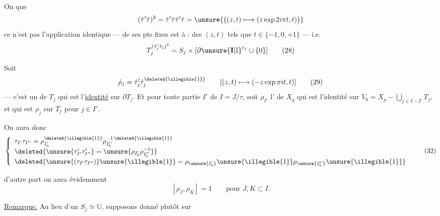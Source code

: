 
On  que
\[
(\dot\tau'\dot\tau)^2
=\dot\tau'\dot\tau\dot\tau'\dot\tau
=\unsure{\bigl((z,t)\longmapsto(z\exp 2i\pi t,t)\bigr)}
\]
ce n'est pas l'application identique ---  de ses pts fixes est  à : 
 des $(z,t)$ tels que $t\in\{-1,0,+1\}$ --- i.e.
\[
T_j^{(\dot\tau'_j\dot\tau_j)^2}
=S_j\times[\partial\unsure{\mathbf I|\mathbb I}^{\varepsilon_j}\cup\{0\}]
\tag{28}
\]



Soit 
\[
\dot\rho_j=\dot\tau'_j\dot\tau_j^{\deleted{\illegible{1}}}
\qquad [(z,t)\longmapsto(-z\exp\pi it,t)]
\tag{29}
\]
--- c'est un  de $T_j$ qui est l'\uline{identité} sur $\partial T_j$.
Et pour toute partie $I'$ de $I=J/\tau$, soit $\rho_{I'}$ l' de $X_g$ qui est l'identité sur
$V_0=X_g-\bigcup_{j\in I-I'}T_j$,
et qui est $\rho_j$ sur $T_j$ pour $j\in I'$.



On aura donc
\[
\left\{
\begin{array}{l}
\tau_{I'}\tau_{I''}
=\rho_{I'_0}^{\deleted{\illegible{1}}}\rho_{I''_0}^{-1\,\deleted{\illegible{1}}}
\\[3pt]
\deleted{\unsure{\tau'_{I'}\tau'_{I''}}=\unsure{\rho_{I'_0}\rho_{I''_0}^{-1}}}
\\[3pt]
\deleted{\unsure{(\tau_{I'}\tau_{I''})}\unsure{\illegible{1}}=\rho_{\unsure{I'_0}}\unsure{\illegible{1}}\rho_{\unsure{I''_0}}\unsure{\illegible{1}}}
\end{array}
\right.
\tag{32}
\]

d'autre part on aura évidemment
\[
[\rho_J,\rho_K]=1\qquad\text{pour }J,K\subset I.
\tag{33}
\]

\uline{Remarque.} Au lieu d'un  $S_j\simeq\mathbb U$,
supposons donné plutôt sur

